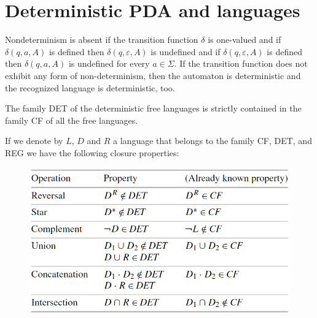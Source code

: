 \section{Deterministic PDA and languages}

Nondeterminism is absent if the transition function $\delta$ is one-valued and if $\delta (q, a, A)$ is defined then $\delta(q, \varepsilon, A)$ is undefined and 
if $\delta(q, \varepsilon, A)$ is defined then $\delta (q, a, A)$ is undefined for every $a \in \Sigma$. If the transition function does not exhibit any form of 
non-determinism, then the automaton is deterministic and the recognized language is deterministic, too. 

The family DET of the deterministic free languages is strictly contained in the family CF of all the free languages. 

If we denote by $L$, $D$ and $R$ a language that belongs to the family CF, DET, and REG we have the following closure properties: 
\begin{figure}[H]
    \centering
    \includegraphics[width=0.8\linewidth]{images/PDAclosure.png}
\end{figure}